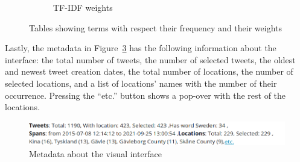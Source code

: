 \begin{figure}
\begin{subfigure}[b]{0.48\textwidth}
        \caption{\ac{TF-IDF} weights}
        \label{fig:tfidf_table}
    \end{subfigure}
    \caption{Tables showing terms with respect their frequency and their weights}
    \label{fig:tables_lda_tfidf}
\end{figure}

Lastly, the metadata in Figure~\ref{fig:meta_data} has the following information about the
interface: the total number of tweets, the number of selected tweets, the oldest and newest tweet
creation dates, the total number of locations, the number of selected locations, and a list of
locations' names with the number of their occurrence. Pressing the ``etc.'' button shows a pop-over
with the rest of the locations. 

\begin{figure}[H]
    \begin{center}
        \includegraphics[width=\columnwidth]{./images/meta_data.png}
    \end{center}
    \caption{Metadata about the visual interface}
    \label{fig:meta_data}
\end{figure}
